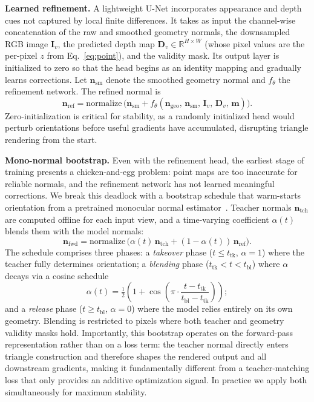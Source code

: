 \documentclass{llmxive}
\providecommand{\boldstart}[1]{\vspace{0.1in}\noindent\textbf{#1}}
\begin{document}
\boldstart{Learned refinement.}
A lightweight U-Net incorporates appearance and depth cues not captured by local finite differences. It takes as input the channel-wise concatenation of the raw and smoothed geometry normals, the downsampled RGB image $\mathbf{I}_v$, the predicted depth map $\mathbf{D}_v\!\in\!\mathbb{R}^{H\times W}$ (whose pixel values are the per-pixel $z$ from Eq.~\eqref{eq:point}), and the validity mask. Its output layer is initialized to zero so that the head begins as an identity mapping and gradually learns corrections. Let $\mathbf{n}_{\mathrm{sm}}$ denote the smoothed geometry normal and $f_\theta$ the refinement network. The refined normal is
\begin{equation}
    \mathbf{n}_{\mathrm{ref}} = \mathrm{normalize}\,\!\bigl(\mathbf{n}_{\mathrm{sm}} + f_\theta(\mathbf{n}_{\mathrm{geo}},\, \mathbf{n}_{\mathrm{sm}},\, \mathbf{I}_v,\, \mathbf{D}_v,\, \mathbf{m})\bigr).
    \label{eq:refine}
\end{equation}
Zero-initialization is critical for stability, as a randomly initialized head would perturb orientations before useful gradients have accumulated, disrupting triangle rendering from the start.

\boldstart{Mono-normal bootstrap.}
Even with the refinement head, the earliest stage of training presents a chicken-and-egg problem: point maps are too inaccurate for reliable normals, and the refinement network has not learned meaningful corrections. We break this deadlock with a bootstrap schedule that warm-starts orientation from a pretrained monocular normal estimator~\citep{eftekhar2021omnidata}. Teacher normals $\mathbf{n}_{\mathrm{tch}}$ are computed offline for each input view, and a time-varying coefficient $\alpha(t)$ blends them with the model normals:
\begin{equation}
    \mathbf{n}_{\mathrm{fwd}} = \mathrm{normalize}\,\!\bigl(\alpha(t)\,\mathbf{n}_{\mathrm{tch}} + (1 - \alpha(t))\,\mathbf{n}_{\mathrm{ref}}\bigr).
    \label{eq:blend}
\end{equation}
The schedule comprises three phases: a \emph{takeover} phase ($t \leq t_{\mathrm{tk}}$, $\alpha\!=\!1$) where the teacher fully determines orientation; a \emph{blending} phase ($t_{\mathrm{tk}} < t < t_{\mathrm{bl}}$) where $\alpha$ decays via a cosine schedule
\begin{equation}
    \alpha(t) = \tfrac{1}{2}\!\left(1 + \cos\!\left(\pi \cdot \frac{t - t_{\mathrm{tk}}}{t_{\mathrm{bl}} - t_{\mathrm{tk}}}\right)\right);
    \label{eq:cosine}
\end{equation}
and a \emph{release} phase ($t \geq t_{\mathrm{bl}}$, $\alpha\!=\!0$) where the model relies entirely on its own geometry. Blending is restricted to pixels where both teacher and geometry validity masks hold. Importantly, this bootstrap operates on the forward-pass representation rather than on a loss term: the teacher normal directly enters triangle construction and therefore shapes the rendered output and all downstream gradients, making it fundamentally different from a teacher-matching loss that only provides an additive optimization signal. In practice we apply both simultaneously for maximum stability.
\end{document}
